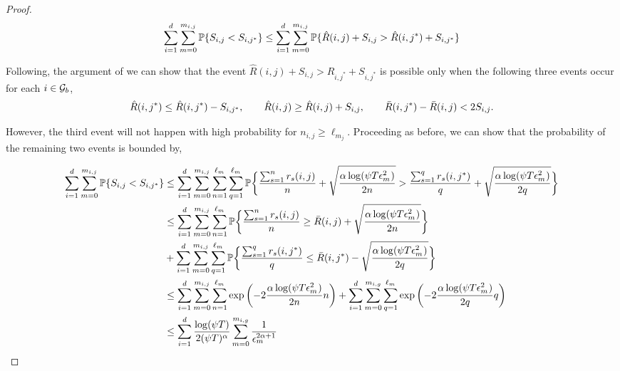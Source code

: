 \begin{proof}
\begin{align*}
\sum_{i=1}^{d}\sum_{m=0}^{m_{i,j}}\mathbb{P}\lbrace S_{i,j} < S_{i,j^*} \rbrace &\leq \sum_{i=1}^{d}\sum_{m=0}^{m_{i,j}}\mathbb{P} \lbrace \hat{R}(i,j) + S_{i,j} > \hat{R}(i,j^*) + S_{i,j^*}\rbrace \\
\end{align*}



Following, the argument of \citet{auer2002finite} we can show that  the event $\hat{R}(i,j) + S_{i,j} > \hat{R}_{i,j^*} + S_{i,j^*}$ is possible only when the following three events occur for each $i\in\mathcal{G}_b$, 
\begin{align*}
\hat{R}(i,j^*) \leq \hat{R}(i,j^*) - S_{i,j^*}  , \hspace*{2em}  \hat{R}(i,j) \geq \hat{R}(i,j) + S_{i,j}, \hspace*{2em}  \bar{R}(i,j^*)-\bar{R}(i,j) < 2 S_{i,j} . 
\end{align*}
 
However, the third event will not happen with high probability for $n_{i,j}\geq \ell_{m_{j}}$. Proceeding as before, we can show that the probability of the remaining two events is bounded by,

\begin{align*}
\sum_{i=1}^{d}\sum_{m=0}^{m_{i,j}}\mathbb{P}\lbrace S_{i,j} < S_{i,j^*} \rbrace & \leq \sum_{i=1}^{d}\sum_{m=0}^{m_{i,j}}\sum_{n=1}^{\ell_{m_{}}}\sum_{q=1}^{\ell_{m_{}}}\mathbb{P}\bigg\lbrace  \dfrac{\sum_{s=1}^{n} r_{s}(i,j)}{n} + \sqrt{\dfrac{\alpha\log(\psi T\epsilon_{m_{}}^2)}{2n}} >  \dfrac{\sum_{s=1}^{q} r_{s}(i,j^*)}{q} + \sqrt{\dfrac{\alpha\log(\psi T\epsilon_{m_{}}^2)}{2q}} \bigg\rbrace \\
& \leq \sum_{i=1}^{d}\sum_{m=0}^{m_{i,j}}\sum_{n =1}^{\ell_{m_{}}}\mathbb{P}\bigg\lbrace  \dfrac{\sum_{s=1}^{n} r_{s}(i,j)}{n} \geq  \bar{R}(i,j) + \sqrt{\dfrac{\alpha\log(\psi T\epsilon_{m_{}}^2)}{2n}} \bigg\rbrace \\
&+  \sum_{i=1}^{d}\sum_{m=0}^{m_{i,j}}\sum_{q =1}^{\ell_{m_{}}}\mathbb{P}\bigg\lbrace  \dfrac{\sum_{s=1}^{q} r_{s}(i,j^*)}{q} \leq  \bar{R}(i,j^*) - \sqrt{\dfrac{\alpha\log(\psi T\epsilon_{m_{}}^2)}{2q}} \bigg\rbrace\\
&\leq \sum_{i=1}^{d}\sum_{m=0}^{m_{i,j}}\sum_{n=1}^{\ell_{m_{}}}\exp\left(-2\dfrac{\alpha\log(\psi T\epsilon_{m_{}}^2)}{2n}n \right) + \sum_{i=1}^{d}\sum_{m=0}^{m_{i,g}}\sum_{q=1}^{\ell_{m_{}}}\exp\left(-2\dfrac{\alpha\log(\psi T\epsilon_{m_{}}^2)}{2q}q \right)\\
&\leq \sum_{i=1}^{d}\dfrac{\log(\psi T )}{2(\psi T)^{\alpha}}\sum_{m=0}^{m_{i,g}}\dfrac{1}{\epsilon_{m_{}}^{2\alpha +1}}
\end{align*}


\end{proof}
